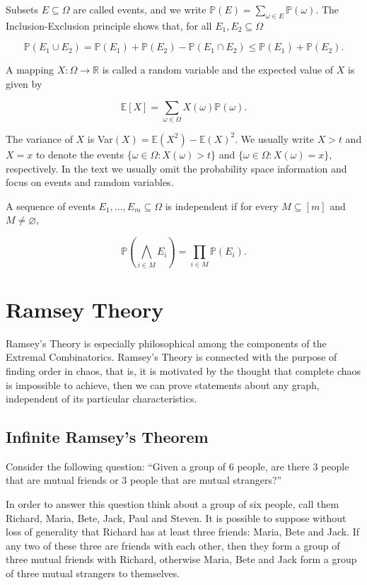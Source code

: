 \documentclass[12pt,twoside,a4paper,bibliography=totocnumbered]{book}
\numberwithin{equation}{section}
\let\emptyset=\varnothing
\theoremstyle{remark}
\begin{document}
Subsets $E \subseteq \Omega$ are called events, and we write $\mathbb{P}(E) = \sum_{\omega \in E}\mathbb{P}(\omega)$. The Inclusion-Exclusion principle shows that, for all $E_1, E_2 \subseteq \Omega$

$$ \mathbb{P}(E_1 \cup E_2) = \mathbb{P}(E_1) + \mathbb{P}(E_2) - \mathbb{P}(E_1 \cap E_2) \leq \mathbb{P}(E_1) + \mathbb{P}(E_2).$$

A mapping $X\colon \Omega \rightarrow \mathbb{R}$ is called a random variable and the expected value of $X$ is given by

$$ \mathbb{E}[X] = \sum_{\omega \in \Omega}X(\omega)\mathbb{P}(\omega) .$$

The variance of $X$ is Var$(X) = \mathbb{E}(X^2) - \mathbb{E}(X)^2$. We usually write $X > t$ and $X = x$ to denote the events $\{\omega 
\in \Omega \colon X(\omega) > t\}$ and $\{\omega \in \Omega \colon X(\omega) = x\}$, respectively. In the text we usually omit the probability space information and focus on events and ramdom variables. 

A sequence of events $E_1,...,E_m \subseteq \Omega$ is independent if for every $M \subseteq [m]$ and $M \neq \emptyset$,

$$ \mathbb{P}\left( \bigwedge_{i \in M}E_i \right) = \prod_{i \in M} \mathbb{P}(E_i).$$

\chapter{Ramsey Theory}

Ramsey's Theory is especially philosophical among the components of the Extremal Combinatorics. Ramsey's Theory is connected with the purpose of finding order in chaos, that is, it is motivated by the thought that complete chaos is impossible to achieve, then we can prove statements about any graph, independent of its particular characteristics.

\section{Infinite Ramsey's Theorem}
Consider the following question:
``Given a group of 6 people, are there 3 people that are mutual friends or 3 people that are mutual strangers?''

In order to answer this question think about a group of six people, call them Richard, Maria, Bete, Jack, Paul and Steven. It is possible to suppose without loss of generality that Richard has at least three friends: Maria, Bete and Jack. If any two of these three are friends with each other, then they form a group of three mutual friends with Richard, otherwise Maria, Bete and Jack form a group of three mutual strangers to themselves. 
\end{document}
